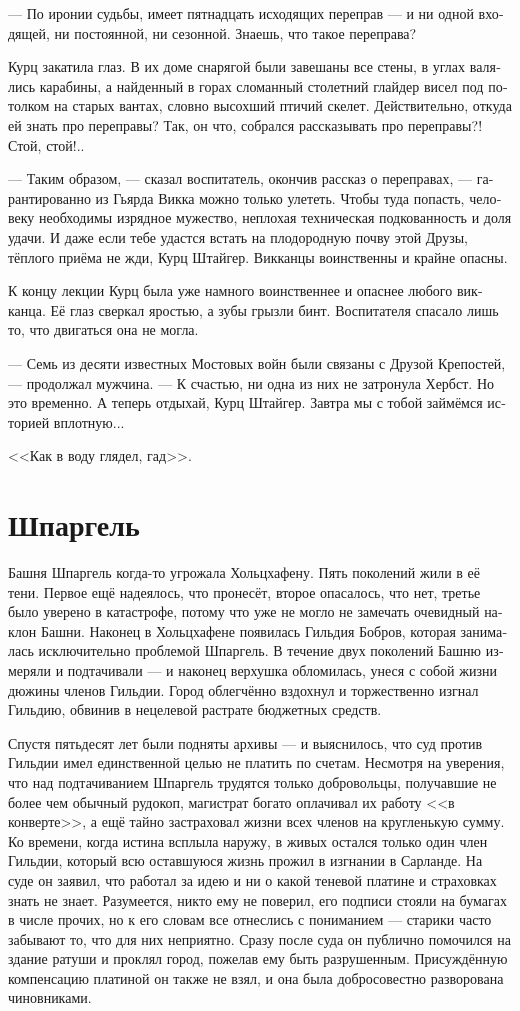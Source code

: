\documentclass[a4paper,12pt,fleqn]{book}\usepackage{cooltooltips}\usepackage{polyglossia}\setdefaultlanguage[babelshorthands=true]{russian}\setotherlanguage{english}\defaultfontfeatures{Ligatures=TeX,Mapping=tex-text} \usepackage{xcolor}\definecolor{lightgray}{HTML}{bbbbbb}\color{lightgray}\newcommand{\ml}[3]{\textenglish{\textcolor{black}{#3}}}
\begin{document}
--- По иронии судьбы, имеет пятнадцать исходящих переправ --- и ни одной входящей, ни постоянной, ни сезонной.
Знаешь, что такое переправа?

Курц закатила глаз.
В их доме снарягой были завешаны все стены, в углах валялись карабины, а найденный в горах сломанный столетний глайдер висел под потолком на старых вантах, словно высохший птичий скелет.
Действительно, откуда ей знать про переправы?
Так, он что, собрался рассказывать про переправы?!
Стой, стой!..

--- Таким образом, --- сказал воспитатель, окончив рассказ о переправах, --- гарантированно из Гьярда Викка можно только улететь.
Чтобы туда попасть, человеку необходимы изрядное мужество, неплохая техническая подкованность и доля удачи.
И даже если тебе удастся встать на плодородную почву этой Друзы, тёплого приёма не жди, Курц Штайгер.
Викканцы воинственны и крайне опасны.

К концу лекции Курц была уже намного воинственнее и опаснее любого викканца.
Её глаз сверкал яростью, а зубы грызли бинт.
Воспитателя спасало лишь то, что двигаться она не могла.

--- Семь из десяти известных Мостовых войн были связаны с Друзой Крепостей, --- продолжал мужчина.
--- К счастью, ни одна из них не затронула Хербст.
Но это временно.
А теперь отдыхай, Курц Штайгер.
Завтра мы с тобой займёмся историей вплотную...

<<Как в воду глядел, гад>>.

\section{Шпаргель}

Башня Шпаргель когда-то угрожала Хольцхафену.
Пять поколений жили в её тени.
Первое ещё надеялось, что пронесёт, второе опасалось, что нет, третье было уверено в катастрофе, потому что уже не могло не замечать очевидный наклон Башни.
Наконец в Хольцхафене появилась Гильдия Бобров, которая занималась исключительно проблемой Шпаргель.
В течение двух поколений Башню измеряли и подтачивали --- и наконец верхушка обломилась, унеся с собой жизни дюжины членов Гильдии.
Город облегчённо вздохнул и торжественно изгнал Гильдию, обвинив в нецелевой растрате бюджетных средств.

Спустя пятьдесят лет были подняты архивы --- и выяснилось, что суд против Гильдии имел единственной целью не платить по счетам.
Несмотря на уверения, что над подтачиванием Шпаргель трудятся только добровольцы, получавшие не более чем обычный рудокоп, магистрат богато оплачивал их работу <<в конверте>>, а ещё тайно застраховал жизни всех членов на кругленькую сумму.
Ко времени, когда истина всплыла наружу, в живых остался только один член Гильдии, который всю оставшуюся жизнь прожил в изгнании в Сарланде.
На суде он заявил, что работал за идею и ни о какой теневой платине и страховках знать не знает.
Разумеется, никто ему не поверил, его подписи стояли на бумагах в числе прочих, но к его словам все отнеслись с пониманием --- старики часто забывают то, что для них неприятно.
Сразу после суда он публично помочился на здание ратуши и проклял город, пожелав ему быть разрушенным.
Присуждённую компенсацию платиной он также не взял, и она была добросовестно разворована чиновниками.
\end{document}
